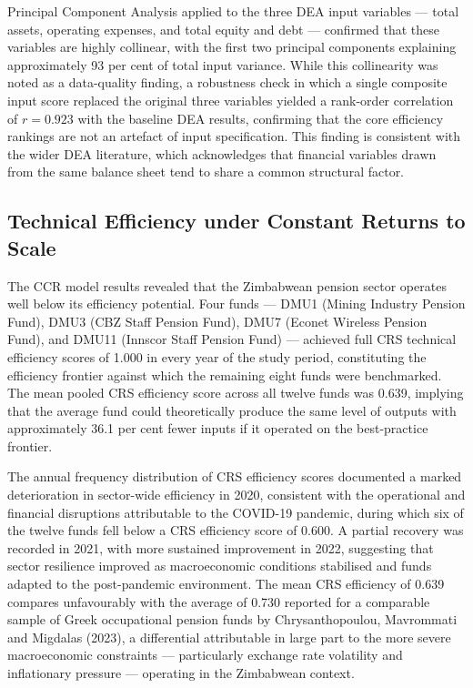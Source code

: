 \documentclass[12pt,a4paper]{article}
\begin{document}
Principal Component Analysis applied to the three DEA input variables --- total assets, operating expenses, and total equity and debt --- confirmed that these variables are highly collinear, with the first two principal components explaining approximately 93 per cent of total input variance. While this collinearity was noted as a data-quality finding, a robustness check in which a single composite input score replaced the original three variables yielded a rank-order correlation of $r = 0.923$ with the baseline DEA results, confirming that the core efficiency rankings are not an artefact of input specification. This finding is consistent with the wider DEA literature, which acknowledges that financial variables drawn from the same balance sheet tend to share a common structural factor.

\subsection{Technical Efficiency under Constant Returns to Scale}

The CCR model results revealed that the Zimbabwean pension sector operates well below its efficiency potential. Four funds --- DMU1 (Mining Industry Pension Fund), DMU3 (CBZ Staff Pension Fund), DMU7 (Econet Wireless Pension Fund), and DMU11 (Innscor Staff Pension Fund) --- achieved full CRS technical efficiency scores of 1.000 in every year of the study period, constituting the efficiency frontier against which the remaining eight funds were benchmarked. The mean pooled CRS efficiency score across all twelve funds was 0.639, implying that the average fund could theoretically produce the same level of outputs with approximately 36.1 per cent fewer inputs if it operated on the best-practice frontier.

The annual frequency distribution of CRS efficiency scores documented a marked deterioration in sector-wide efficiency in 2020, consistent with the operational and financial disruptions attributable to the COVID-19 pandemic, during which six of the twelve funds fell below a CRS efficiency score of 0.600. A partial recovery was recorded in 2021, with more sustained improvement in 2022, suggesting that sector resilience improved as macroeconomic conditions stabilised and funds adapted to the post-pandemic environment. The mean CRS efficiency of 0.639 compares unfavourably with the average of 0.730 reported for a comparable sample of Greek occupational pension funds by Chrysanthopoulou, Mavrommati and Migdalas (2023), a differential attributable in large part to the more severe macroeconomic constraints --- particularly exchange rate volatility and inflationary pressure --- operating in the Zimbabwean context.
\end{document}
